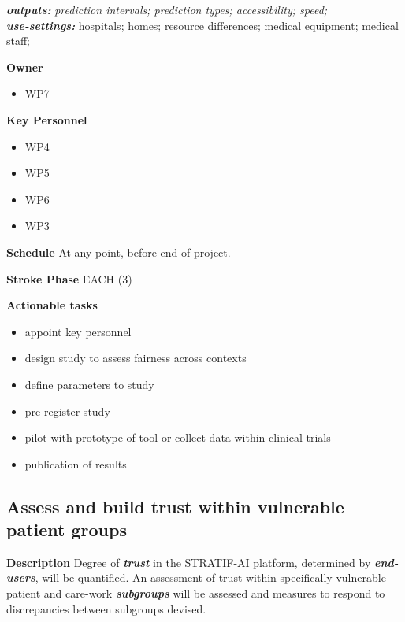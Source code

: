 \documentclass[
  letterpaper,
  DIV=11,
  numbers=noendperiod]{scrreport}
\providecommand{\tightlist}{%
  \setlength{\itemsep}{0pt}\setlength{\parskip}{0pt}}\usepackage{longtable,booktabs,array}
\begin{document}
\textbf{\emph{outputs:}} \emph{prediction intervals; prediction types;
accessibility; speed;}\\
\textbf{\emph{use-settings:}} hospitals; homes; resource differences;
medical equipment; medical staff;

\textbf{Owner}

\begin{itemize}
\tightlist
\item
  WP7
\end{itemize}

\textbf{Key Personnel}

\begin{itemize}
\tightlist
\item
  WP4
\item
  WP5
\item
  WP6
\item
  WP3
\end{itemize}

\textbf{Schedule} At any point, before end of project.

\textbf{Stroke Phase} EACH (3)

\textbf{Actionable tasks}

\begin{itemize}
\tightlist
\item
  appoint key personnel
\item
  design study to assess fairness across contexts
\item
  define parameters to study
\item
  pre-register study
\item
  pilot with prototype of tool or collect data within clinical trials
\item
  publication of results
\end{itemize}

\hypertarget{assess-and-build-trust-within-vulnerable-patient-groups}{%
\subsection{Assess and build trust within vulnerable patient
groups}\label{assess-and-build-trust-within-vulnerable-patient-groups}}

\textbf{Description} Degree of \textbf{\emph{trust}} in the STRATIF-AI
platform, determined by \textbf{\emph{end-users}}, will be quantified.
An assessment of trust within specifically vulnerable patient and
care-work \textbf{\emph{subgroups}} will be assessed and measures to
respond to discrepancies between subgroups devised.
\end{document}
